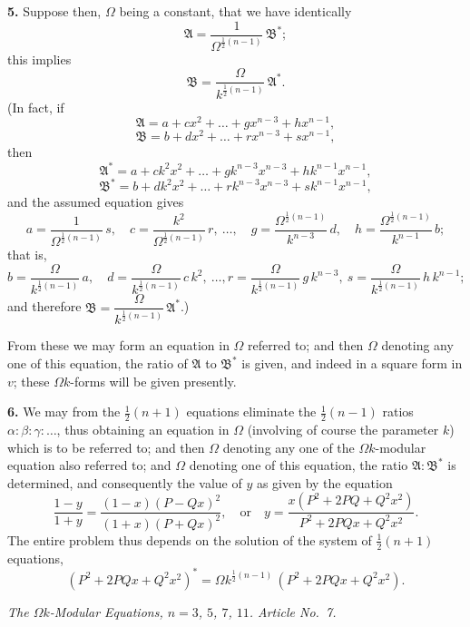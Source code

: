 \documentclass[11pt]{article}
\begin{document}
\textbf{5.} Suppose then, $\Omega$ being a constant, that we have identically
\[
\mathfrak{A} = \frac{1}{\Omega^{\frac{1}{2}(n-1)}}\,\mathfrak{B}^{*};
\]
this implies
\[
\mathfrak{B} = \frac{\Omega}{k^{\frac{1}{2}(n-1)}}\,\mathfrak{A}^{*}.
\]
(In fact, if
\[
\mathfrak{A} = a + cx^{2} + \ldots + g x^{n-3} + h x^{n-1},
\]
\[
\mathfrak{B} = b + dx^{2} + \ldots + r x^{n-3} + s x^{n-1},
\]
then
\[
\mathfrak{A}^{*} = a + ck^{2} x^{2} + \ldots + g k^{n-3} x^{n-3} + h k^{n-1} x^{n-1},
\]
\[
\mathfrak{B}^{*} = b + dk^{2} x^{2} + \ldots + r k^{n-3} x^{n-3} + s k^{n-1} x^{n-1},
\]
and the assumed equation gives
\[
a = \frac{1}{\Omega^{\frac{1}{2}(n-1)}}\,s,\quad c = \frac{k^{2}}{\Omega^{\frac{1}{2}(n-1)}}\,r,\ \ldots,\quad g = \frac{\Omega^{\frac{1}{2}(n-1)}\!\!}{k^{n-3}}\,d,\quad h = \frac{\Omega^{\frac{1}{2}(n-1)}\!\!}{k^{n-1}}\,b;
\]
that is,
\[
b = \frac{\Omega}{k^{\frac{1}{2}(n-1)}}\,a,\quad d = \frac{\Omega}{k^{\frac{1}{2}(n-1)}}\,c\,k^{2},\ \ldots, r = \frac{\Omega}{k^{\frac{1}{2}(n-1)}}\,g\,k^{n-3},\ s = \frac{\Omega}{k^{\frac{1}{2}(n-1)}}\,h\,k^{n-1};
\]
and therefore $\mathfrak{B} = \dfrac{\Omega}{k^{\frac{1}{2}(n-1)}}\,\mathfrak{A}^{*}$.)

From these we may form an equation in $\Omega$ referred to; and then $\Omega$ denoting any one of this equation, the ratio of $\mathfrak{A}$ to $\mathfrak{B}^{*}$ is given, and indeed in a square form in $v$; these $\Omega k$-forms will be given presently.

\textbf{6.} We may from the $\tfrac{1}{2}(n+1)$ equations eliminate the $\tfrac{1}{2}(n-1)$ ratios $\alpha : \beta : \gamma : \ldots$, thus obtaining an equation in $\Omega$ (involving of course the parameter $k$) which is to be referred to; and then $\Omega$ denoting any one of the $\Omega k$-modular equation also referred to; and $\Omega$ denoting one of this equation, the ratio $\mathfrak{A} : \mathfrak{B}^{*}$ is determined, and consequently the value of $y$ as given by the equation
\[
\frac{1-y}{1+y} = \frac{(1-x)(P-Qx)^{2}}{(1+x)(P+Qx)^{2}},\quad \text{or}\quad y = \frac{x(P^{2} + 2PQ + Q^{2}x^{2})}{P^{2} + 2PQx + Q^{2}x^{2}}.
\]
The entire problem thus depends on the solution of the system of $\tfrac{1}{2}(n+1)$ equations,
\[
(P^{2} + 2PQx + Q^{2}x^{2})^{*} = \Omega k^{\frac{1}{2}(n-1)}\,(P^{2} + 2PQx + Q^{2}x^{2}).
\]

\bigskip

\noindent\textit{The $\Omega k$-Modular Equations, $n = 3$, $5$, $7$, $11$. Article No.\ 7.}

\medskip
\end{document}
